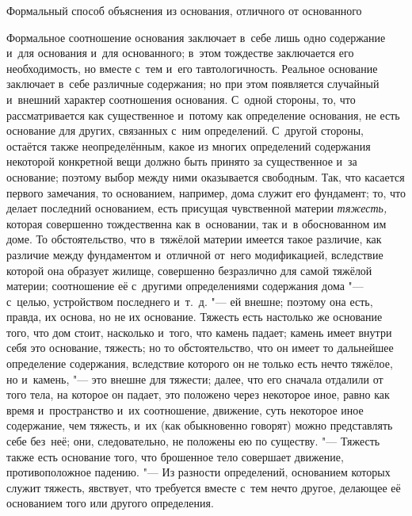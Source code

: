 \subsubremark%
{Формальный способ объяснения из основания, отличного от основанного}

Формальное соотношение основания заключает в~себе лишь одно содержание и~для
основания и~для основанного; в~этом тождестве заключается его необходимость,
но вместе с~тем и~его тавтологичность. Реальное основание заключает в~себе
различные содержания; но при этом появляется случайный и~внешний характер
соотношения основания. С~одной стороны, то, что рассматривается как
существенное и~потому как определение основания, не есть основание для других,
связанных с~ним определений. С~другой стороны, остаётся также неопределённым,
какое из многих определений содержания некоторой конкретной вещи должно быть
принято за существенное и~за основание; поэтому выбор между ними оказывается
свободным. Так, что касается первого замечания, то основанием, например, дома
служит его фундамент; то, что делает последний основанием, есть присущая
чувственной материи {\em тяжесть,} которая совершенно тождественна как
в~основании, так и~в обоснованном им доме. То обстоятельство, что в~тяжёлой
материи имеется такое различие, как различие между фундаментом и~отличной
от~него модификацией, вследствие которой она образует жилище, совершенно
безразлично для самой тяжёлой материи; соотношение её с~другими определениями
содержания дома "--- с~целью, устройством последнего и~т.~д. "--- ей внешне;
поэтому она есть, правда, их основа, но не их основание. Тяжесть есть настолько
же основание того, что дом стоит, насколько и~того, что камень падает; камень
имеет внутри себя это основание, тяжесть; но то обстоятельство, что он имеет то
дальнейшее определение содержания, вследствие которого он не только есть нечто
тяжёлое, но и~камень, "--- это внешне для тяжести; далее, что его сначала
отдалили от того тела, на которое он падает, это положено через некоторое
иное, равно как время и~пространство и~их соотношение, движение, суть
некоторое иное содержание, чем тяжесть, и~их (как обыкновенно говорят) можно
представлять себе без~неё; они, следовательно, не положены ею по существу. "---
Тяжесть также есть основание того, что брошенное тело совершает движение,
противоположное падению. "--- Из разности определений, основанием которых
служит тяжесть, явствует, что требуется вместе с~тем нечто другое, делающее
её основанием того или другого определения.

